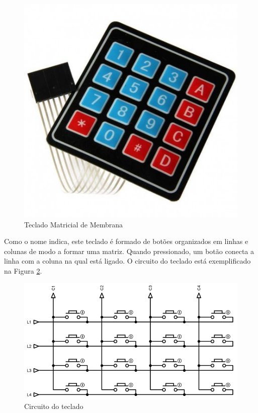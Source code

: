 \begin{figure}[htbp]
	\centering
	\includegraphics[scale=0.3]{figuras/teclado-matricial.jpg}
	\caption{Teclado Matricial de Membrana}
	\label{fig:teclado}
\end{figure}

Como o nome indica, este teclado é formado de botões organizados em linhas e colunas de modo a formar uma matriz. Quando pressionado, um botão conecta a linha com a coluna na qual está ligado. O circuito do teclado está exemplificado na Figura \ref{fig:teclado-conexoes}.

\begin{figure}[htbp]
	\centering
	\includegraphics[scale=0.4]{figuras/matrix-1024x558.png}
	\caption{Circuito do teclado}
	\label{fig:teclado-conexoes}
\end{figure}

